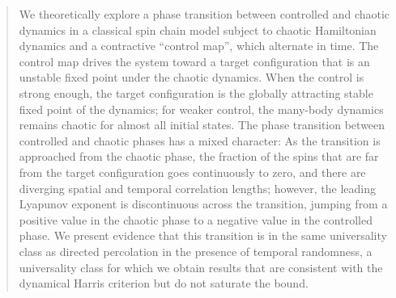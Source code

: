 \documentclass[twocolumn,amsmath,amssymb,floatfix,superscriptaddress,aps,prl]{revtex4-2}
\newcommand{\elisha}[1]{\textcolor{orange}{#1}}
\begin{document}
\begin{abstract}
We theoretically explore a phase transition between controlled and chaotic dynamics in a classical spin chain model subject to chaotic Hamiltonian dynamics and a contractive ``control map'', which alternate %
in time. The control map drives the system toward a target configuration that is an unstable fixed point under the chaotic dynamics.  When the control is strong enough, the target configuration is the globally attracting stable fixed point of the dynamics; for weaker control, the many-body dynamics remains chaotic for almost all initial states.  The phase transition between controlled and chaotic phases has a mixed character:  As the transition is approached from the chaotic phase, the fraction of the spins that are far from the target configuration goes continuously to zero, and there are  diverging spatial and temporal correlation lengths; however, the leading Lyapunov exponent is discontinuous across the transition, jumping from a positive value in the chaotic phase to a negative value in the controlled phase.  We present evidence that this transition is in the same universality class as directed percolation in the presence of temporal randomness, a universality class for which we %
obtain results that are consistent with the dynamical Harris criterion but do not saturate the bound.



\end{abstract}
\end{document}
